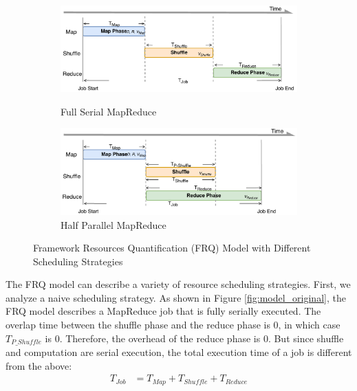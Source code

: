 {\begin{figure}
	\centering
	\begin{minipage}[hb]{\linewidth}
		\begin{subfigure}{\linewidth}
			\begin{minipage}{\linewidth}
				\includegraphics[width=\linewidth]{fig/model_original}
				\caption{\color{blue}Full Serial MapReduce}
				\label{fig:model_original}
			\end{minipage}
			\begin{minipage}{\linewidth}
				\includegraphics[width=\linewidth]{fig/model_hadoop}
				\caption{\color{blue}Half Parallel MapReduce}
				\label{fig:model_hadoop}
			\end{minipage}
		\end{subfigure}
		\caption{\color{blue}Framework Resources Quantification (FRQ) Model with Different Scheduling Strategies}
		\label{fig:model_strategies}
	\end{minipage}
\end{figure}

The FRQ model can describe a variety of resource scheduling strategies. First, we analyze a naive scheduling strategy. As shown in Figure \ref{fig:model_original}, the FRQ model describes a MapReduce job that is fully serially executed. The overlap time between the shuffle phase and the reduce phase is \(0\), in which case \(T_{P\_Shuffle}\) is \(0\). Therefore, the overhead of the reduce phase is 0. But since shuffle and computation are serial execution, the total execution time of a job is different from the above:
\begin{equation}
\label{equation_Tjob2}
\begin{aligned}
    T_{Job} &= T_{Map} + T_{Shuffle} + T_{Reduce}
\end{aligned}
\end{equation}

}
